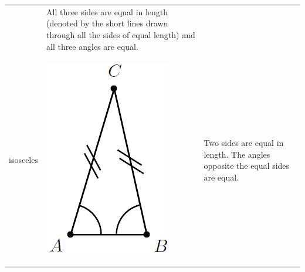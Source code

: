 \begin{center}
\begin{xtabular*}{\mytablewidth}[t]{|p{10\mystarwidth}|p{10\mystarwidth}|p{10\mystarwidth}|}
\begin{center}
      \vspace{2pt}
    \vspace{.1in}
    \end{center}    
                 &
        All three sides are equal in length (denoted by the short lines drawn through all the sides of equal length) and all three angles are equal.%
     \tabularnewline{}
        isosceles &
    \setcounter{subfigure}{0}
\label{m39368*id317593}
    \begin{center}
    \label{m39368*id317593!!!underscore!!!media}\label{m39368*id317593!!!underscore!!!printimage}\includegraphics{col11306.imgs/m39368_MG10C13_024.png} %
      \vspace{2pt}
    \vspace{.1in}
    \end{center}    
                 &
        Two sides are equal in length. The angles opposite the equal sides are equal.%

\end{xtabular*}
\end{center}
